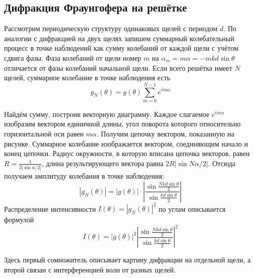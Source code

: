 \subsection{Дифракция Фраунгофера на решётке}
Рассмотрим периодическую структуру одинаковых щелей с периодом $d$. По аналогии с дифракцией на двух щелях запишем суммарный колебательный процесс в точке наблюдений как сумму колебаний от каждой щели с учётом сдвига фазы. Фаза колебаний от щели номер $m$ на $\alpha_m = m\alpha = -mkd\sin\theta$  отличается от фазы колебаний начальной щели. Если всего решётка имеет $N$ щелей, суммарное колебание в точке наблюдения есть
\[
g_N(\theta) = g(\theta) \sum_{m=0}^{N-1}e^{im\alpha}
\]

\begin{figure}[ht!]
\end{figure}

Найдём сумму, построив векторную диаграмму. Каждое слагаемое $e^{im\alpha}$ изобразим вектором единичной длины, угол поворота которого относительно горизонтальной оси равен $m\alpha$. Получим цепочку вектором, показанную на рисунке.  Суммарное колебание изображается вектором, соединяющим начало и конец цепочки. Радиус окружности, в которую вписана цепочка векторов, равен $R=\frac{1}{2\left|\sin\alpha/2\right|}$, длина результирующего вектора равна $2R\left|\sin N\alpha/2\right|$. Отсюда получаем амплитуду колебания в точке наблюдения:
\[
    \left|g_N(\theta)\right| = \left|g(\theta)\right| \cdot \left|\frac{\sin{\frac{Nkd\sin\theta}{2}}}{\sin{\frac{kd\sin\theta}{2}}}\right|
\]
Распределение интенсивности $I(\theta) = \left|g_N(\theta)\right|^2$ по углам описывается формулой
\[
    I(\theta) = \left|g(\theta)\right|^2\left|\frac{\sin{\frac{Nkd\sin\theta}{2}}}{\sin{\frac{kd\sin\theta}{2}}}\right|^2
\]

Здесь первый сомножитель описывает картину дифракции на отдельной щели, а второй связан с интерференцией волн от разных щелей.


